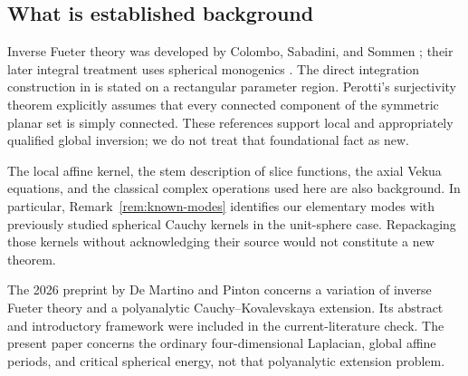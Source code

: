 \documentclass[11pt,a4paper]{article}
\numberwithin{equation}{section}
\theoremstyle{definition}
\theoremstyle{remark}
\begin{document}
\subsection{What is established background}
Inverse Fueter theory was developed by Colombo, Sabadini, and Sommen
\cite{CSS}; their later integral treatment uses spherical monogenics
\cite{CSSIntegral}. The direct integration construction in
\cite[Theorem~3]{CPSS} is stated on a rectangular parameter region.
Perotti's surjectivity theorem \cite[Theorem~2]{Perotti} explicitly assumes
that every connected component of the symmetric planar set is simply
connected. These references support local and appropriately qualified
global inversion; we do not treat that foundational fact as new.

The local affine kernel, the stem description of slice functions, the
axial Vekua equations, and the classical complex operations used here are
also background. In particular, Remark~\ref{rem:known-modes} identifies
our elementary modes with previously studied spherical Cauchy kernels in
the unit-sphere case. Repackaging those kernels without acknowledging
their source would not constitute a new theorem.

The 2026 preprint by De Martino and Pinton \cite{DMP2026} concerns a
variation of inverse Fueter theory and a polyanalytic
Cauchy--Kovalevskaya extension. Its abstract and introductory framework
were included in the current-literature check. The present paper concerns
the ordinary four-dimensional Laplacian, global affine periods, and
critical spherical energy, not that polyanalytic extension problem.
\end{document}
